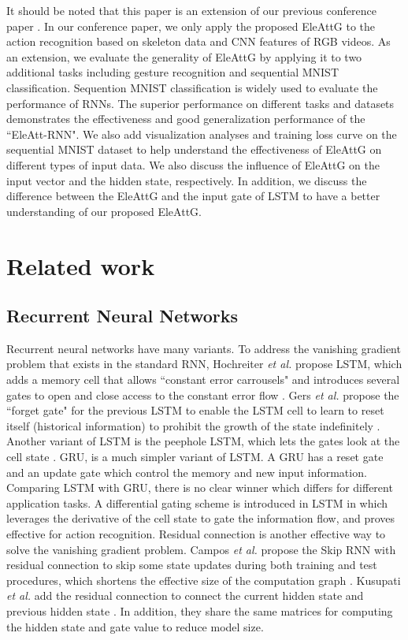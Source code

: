 \documentclass[journal]{IEEEtran}
\begin{document}
It should be noted that this paper is an extension of our previous conference paper \cite{zhang2018adding}. In our conference paper, we only apply the proposed EleAttG to the action recognition based on skeleton data and CNN features of RGB videos. As an extension, we evaluate the generality of EleAttG by applying it to two additional tasks including gesture recognition and sequential MNIST classification. Sequention MNIST classification is widely used to evaluate the performance of RNNs. The superior performance on different tasks and datasets demonstrates the effectiveness and good generalization performance of the ``EleAtt-RNN". We also add visualization analyses and training loss curve on the sequential MNIST dataset  to help understand the effectiveness of EleAttG on different types of input data.  We also discuss the influence of EleAttG on the input vector and the hidden state, respectively. In addition, we discuss the difference between the EleAttG and the input gate of LSTM to have a better understanding of our proposed EleAttG.   

\section{Related work}
\subsection{Recurrent Neural Networks}

Recurrent neural networks have many variants. To address the vanishing gradient problem that exists in the standard RNN, Hochreiter {\it et al.} propose LSTM, which adds a memory cell that allows ``constant error carrousels" and introduces several gates to open and close access to the constant error flow \cite{hochreiter1997long}. Gers {\it et al.} propose the ``forget gate" for the previous LSTM to enable the LSTM cell to learn to reset itself (historical information) to prohibit the growth of the state indefinitely \cite{gers1999learning}. Another variant of LSTM is the peephole LSTM, which lets the gates look at the cell state \cite{gers2002learning}. GRU, is a much simpler variant of LSTM. A GRU has a reset gate and an update gate which control the memory and new input information. Comparing LSTM with GRU, there is no clear winner \cite{chung2014empirical,jozefowicz2015empirical} which differs for different application tasks. A differential gating scheme is introduced in LSTM in \cite{veeriah2015differential} which leverages the derivative of the cell state to gate the information flow, and proves effective for action recognition. Residual connection is another effective way to solve the vanishing gradient problem. Campos {\it{et al.}} propose the Skip RNN with residual connection to skip some state updates during both training and test procedures, which shortens the effective size of the computation graph \cite{campos2018skip}. Kusupati {\it{et al.}} add the residual connection to connect the current hidden state and previous hidden state \cite{kusupati2018fastgrnn}. In addition, they share the same matrices for computing the hidden state and gate value to reduce model size.
\end{document}
